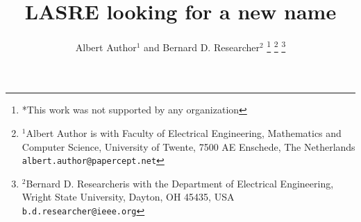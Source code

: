 \documentclass[letterpaper, 10 pt, conference]{ieeeconf}  %
\title{\LARGE \bf
LASRE looking for a new name
}
\author{Albert Author$^{1}$ and Bernard D. Researcher$^{2}$%
\thanks{*This work was not supported by any organization}%
\thanks{$^{1}$Albert Author is with Faculty of Electrical Engineering, Mathematics and Computer Science,
        University of Twente, 7500 AE Enschede, The Netherlands
        {\tt\small albert.author@papercept.net}}%
\thanks{$^{2}$Bernard D. Researcheris with the Department of Electrical Engineering, Wright State University,
        Dayton, OH 45435, USA
        {\tt\small b.d.researcher@ieee.org}}%
}
\begin{document}
\maketitle
\thispagestyle{empty}
\pagestyle{empty}


\begin{abstract}


\end{abstract}










\addtolength{\textheight}{-12cm}   %












%


\end{document}
